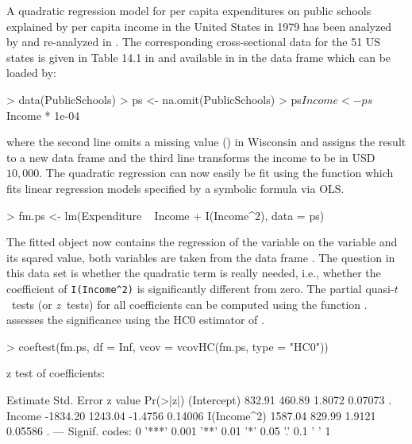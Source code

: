 \documentclass{Z}
\begin{document}
A quadratic regression model for per capita expenditures on public schools
explained by per capita income in the United States in 1979
has been analyzed by \cite{hac:Greene:1993} and re-analyzed in
\cite{hac:Cribari-Neto:2004}. The corresponding cross-sectional
data for the 51 US states
is given in Table 14.1 in \cite{hac:Greene:1993} and available in
 in the data frame  which can be
loaded by:
\begin{Schunk}
\begin{Sinput}
> data(PublicSchools)
> ps <- na.omit(PublicSchools)
> ps$Income <- ps$Income * 1e-04
\end{Sinput}
\end{Schunk}
where the second line omits a missing value () in Wisconsin
and assigns the result to a new data frame  and
the third line transforms the income to be in USD $10,000$.
The quadratic regression can now easily be fit using the function
 which fits linear regression models specified by
a symbolic formula via OLS.
\begin{Schunk}
\begin{Sinput}
> fm.ps <- lm(Expenditure ~ Income + I(Income^2), data = ps)
\end{Sinput}
\end{Schunk}
The fitted  object  now contains the regression of
the variable  on the variable 
and its sqared value, both variables are taken from the data frame .
The question in this data set is whether the quadratic term is really 
needed, i.e., whether the coefficient of \verb/I(Income^2)/ is significantly
different from zero. The partial quasi-$t$~tests (or $z$~tests) for all
coefficients can be computed using the function . \cite{hac:Greene:1993}
assesses the significance using the HC0 estimator of \cite{hac:White:1980}.
\begin{Schunk}
\begin{Sinput}
> coeftest(fm.ps, df = Inf, vcov = vcovHC(fm.ps, type = "HC0"))
\end{Sinput}
\begin{Soutput}
z test of coefficients:

            Estimate Std. Error z value Pr(>|z|)  
(Intercept)   832.91     460.89  1.8072  0.07073 .
Income      -1834.20    1243.04 -1.4756  0.14006  
I(Income^2)  1587.04     829.99  1.9121  0.05586 .
---
Signif. codes:  0 '***' 0.001 '**' 0.01 '*' 0.05 '.' 0.1 ' ' 1 
\end{Soutput}
\end{Schunk}
\end{document}
